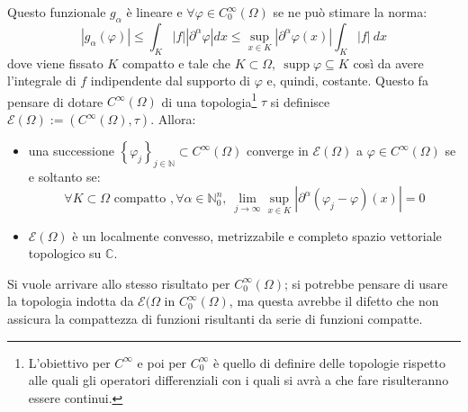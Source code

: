 \documentclass[10pt, a4paper]{scrartcl}
\theoremstyle{definition}
\numberwithin{esempio}{section}
\theoremstyle{definition}
\numberwithin{obs}{section}
\numberwithin{nota}{section}
\numberwithin{equation}{subsection}
\begin{document}
Questo funzionale $g_\alpha $ \`e lineare e $\forall \varphi \in C_0^\infty(\Omega )$ se ne pu\`o stimare la norma:
\begin{equation}
	\left\lvert g_\alpha (\varphi ) \right\rvert \le \int_{K } \left\lvert f \right\rvert \left\lvert \partial ^\alpha \varphi  \right\rvert dx \le \sup_{x \in K} \left\lvert \partial ^\alpha \varphi (x) \right\rvert  \int_{K } \left\lvert f \right\rvert \ dx
\end{equation}
dove viene fissato $K$ compatto e tale che $K \subset \Omega, \ \operatorname{supp}\varphi \subseteq K  $ cos\`i da avere l'integrale di $f$ indipendente dal supporto di $\varphi $ e, quindi, costante. Questo fa pensare di dotare $C^\infty(\Omega )$ di una topologia\footnote{L'obiettivo per $C^\infty$ e poi per $C_0^\infty$ \`e quello di definire delle topologie rispetto alle quali gli operatori differenziali con i quali si avr\`a a che fare risulteranno essere continui.} $\tau $ si definisce $\mathcal{E}(\Omega ):= \left(C^\infty(\Omega ) , \tau \right) $. Allora:
\begin{itemize}
	\item una successione $\left\{ \varphi _j \right\} _{j\in \mathbb{N}} \subset C^\infty(\Omega )$ converge in $\mathcal{E}(\Omega )$ a $\varphi  \in C^\infty(\Omega )$ se e soltanto se:
		\begin{equation}
			\forall K \subset \Omega \text{ compatto }, \forall \alpha \in \mathbb{N}^n_0, \ \lim_{j \to \infty} \sup_{x \in K} \left\lvert \partial ^\alpha (\varphi _j -\varphi )(x) \right\rvert =0
		\end{equation}
	\item $\mathcal{E}(\Omega )$ \`e un localmente convesso, metrizzabile e completo spazio vettoriale topologico su $\mathbb{C}$.
\end{itemize}
Si vuole arrivare allo stesso risultato per $C_0^\infty(\Omega )$; si potrebbe pensare di usare la topologia indotta da $\mathcal{E}(\Omega $ in $C_0^\infty(\Omega )$, ma questa avrebbe il difetto che non assicura la compattezza di funzioni risultanti da serie di funzioni compatte.
\end{document}
